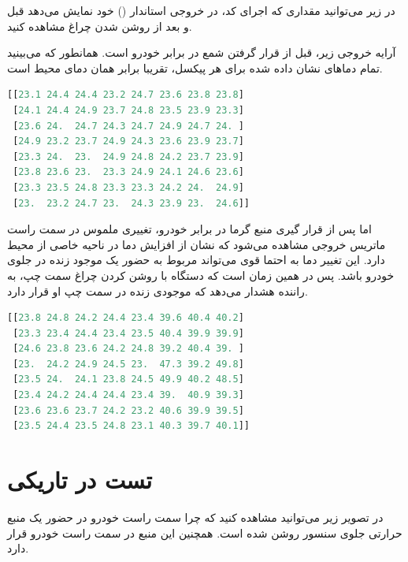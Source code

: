 در زیر می‌توانید مقداری که اجرای کد، در خروجی استاندار () خود نمایش می‌دهد قبل و بعد از روشن شدن چراغ مشاهده کنید.


آرایه خروجی زیر، قبل از قرار گرفتن شمع در برابر خودرو است. همانطور که می‌بینید تمام دماها‌ی نشان داده شده برای هر پیکسل، تقریبا برابر همان دمای محیط است.
\begin{latin}
\begin{lstlisting}[language=python]
[[23.1 24.4 24.4 23.2 24.7 23.6 23.8 23.8]
 [24.1 24.4 24.9 23.7 24.8 23.5 23.9 23.3]
 [23.6 24.  24.7 24.3 24.7 24.9 24.7 24. ]
 [24.9 23.2 23.7 24.9 24.3 23.6 23.9 23.7]
 [23.3 24.  23.  24.9 24.8 24.2 23.7 23.9]
 [23.8 23.6 23.  23.3 24.9 24.1 24.6 23.6]
 [23.3 23.5 24.8 23.3 23.3 24.2 24.  24.9]
 [23.  23.2 24.7 23.  24.3 23.9 23.  24.6]]
\end{lstlisting}
\end{latin}

اما پس از قرار گیری منبع گرما در برابر خودرو، تغییری ملموس در سمت راست ماتریس خروجی مشاهده می‌شود که نشان از افزایش دما در ناحیه خاصی از محیط دارد. این تغییر دما به احتما قوی می‌تواند مربوط به حضور یک موجود زنده در جلوی خودرو باشد. پس در همین زمان است که دستگاه با روشن کردن چراغ سمت چپ، به راننده هشدار می‌دهد که موجودی زنده در سمت چپ او قرار دارد.
\begin{latin}
\begin{lstlisting}[language=python]
[[23.8 24.8 24.2 24.4 23.4 39.6 40.4 40.2]
 [23.3 23.4 24.4 23.4 23.5 40.4 39.9 39.9]
 [24.6 23.8 23.6 24.2 24.8 39.2 40.4 39. ]
 [23.  24.2 24.9 24.5 23.  47.3 39.2 49.8]
 [23.5 24.  24.1 23.8 24.5 49.9 40.2 48.5]
 [23.4 24.2 24.4 24.4 23.4 39.  40.9 39.3]
 [23.6 23.6 23.7 24.2 23.2 40.6 39.9 39.5]
 [23.5 24.4 23.5 24.8 23.1 40.3 39.7 40.1]]
\end{lstlisting}
\end{latin}


\section{تست در تاریکی}

در تصویر زیر می‌توانید مشاهده کنید که چرا سمت راست خودرو در حضور یک منبع حرارتی جلوی سنسور روشن شده است. همچنین این منبع در سمت راست خودرو قرار دارد. 

